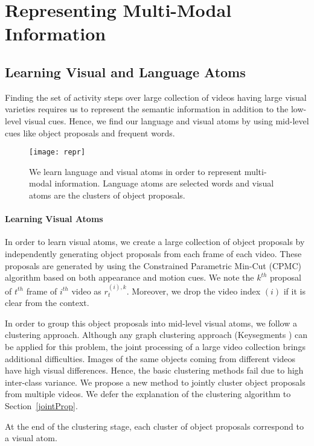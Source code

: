 \section{Representing Multi-Modal Information}
\subsection{Learning Visual and Language Atoms}
\label{atom}
Finding the set of activity steps over large collection of videos having large visual varieties requires us to represent the semantic information in addition to the low-level visual cues. Hence, we find our language and visual atoms by using mid-level cues like object proposals and frequent words.

\begin{figure}[h]
  \texttt{[image: repr]}
  \caption{We learn language and visual atoms in order to represent multi-modal information. Language atoms are selected words and visual atoms are the clusters of object proposals.}
\label{fig:overview}
\end{figure}


\paragraph{Learning Visual Atoms}
In order to learn visual atoms, we create a large collection of object proposals by independently generating object proposals from each frame of each video. These proposals are generated by using the Constrained Parametric Min-Cut (CPMC) \cite{cpmc} algorithm based on both appearance and motion cues. We note the $k^{th}$ proposal of $t^{th}$ frame of $i^{th}$ video as $r^{(i),k}_t$. Moreover, we drop the video index $(i)$ if it is clear from the context.

In order to group this object proposals into mid-level visual atoms, we follow a clustering approach. Although any graph clustering approach (\ie Keysegments \cite{keysegments}) can be applied for this problem, the joint processing of a large video collection brings additional difficulties. Images of the same objects coming from different videos have high visual differences. Hence, the basic clustering methods fail due to high inter-class variance. We propose a new method to jointly cluster object proposals from multiple videos. We defer the explanation of the clustering algorithm to Section~\ref{jointProp}.

At the end of the clustering stage, each cluster of object proposals correspond to a visual atom.

